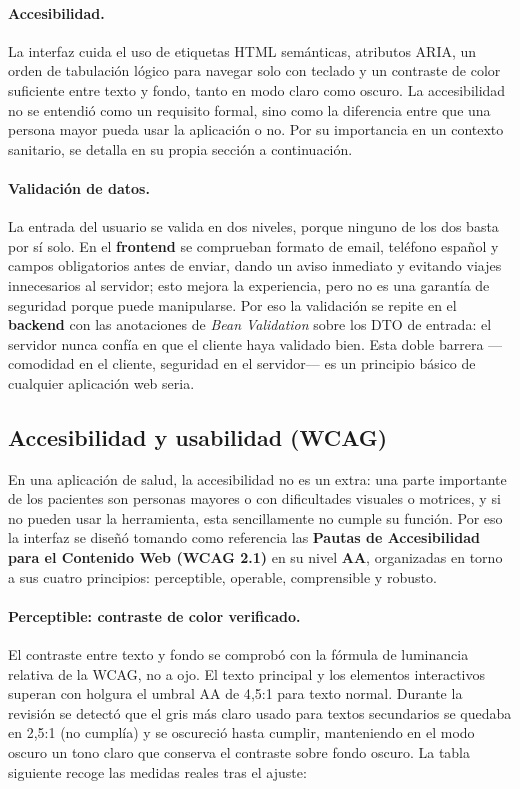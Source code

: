 \documentclass[12pt,a4paper]{report}
\begin{document}
\paragraph{Accesibilidad.} La interfaz cuida el uso de etiquetas HTML semánticas, atributos ARIA, un orden de tabulación lógico para navegar solo con teclado y un contraste de color suficiente entre texto y fondo, tanto en modo claro como oscuro. La accesibilidad no se entendió como un requisito formal, sino como la diferencia entre que una persona mayor pueda usar la aplicación o no. Por su importancia en un contexto sanitario, se detalla en su propia sección a continuación.

\paragraph{Validación de datos.} La entrada del usuario se valida en dos niveles, porque ninguno de los dos basta por sí solo. En el \textbf{frontend} se comprueban formato de email, teléfono español y campos obligatorios antes de enviar, dando un aviso inmediato y evitando viajes innecesarios al servidor; esto mejora la experiencia, pero no es una garantía de seguridad porque puede manipularse. Por eso la validación se repite en el \textbf{backend} con las anotaciones de \emph{Bean Validation} sobre los DTO de entrada: el servidor nunca confía en que el cliente haya validado bien. Esta doble barrera —comodidad en el cliente, seguridad en el servidor— es un principio básico de cualquier aplicación web seria.

\subsection{Accesibilidad y usabilidad (WCAG)}

En una aplicación de salud, la accesibilidad no es un extra: una parte importante de los pacientes son personas mayores o con dificultades visuales o motrices, y si no pueden usar la herramienta, esta sencillamente no cumple su función. Por eso la interfaz se diseñó tomando como referencia las \textbf{Pautas de Accesibilidad para el Contenido Web (WCAG 2.1)} en su nivel \textbf{AA}, organizadas en torno a sus cuatro principios: perceptible, operable, comprensible y robusto.

\paragraph{Perceptible: contraste de color verificado.} El contraste entre texto y fondo se comprobó con la fórmula de luminancia relativa de la WCAG, no a ojo. El texto principal y los elementos interactivos superan con holgura el umbral AA de 4{,}5:1 para texto normal. Durante la revisión se detectó que el gris más claro usado para textos secundarios se quedaba en 2{,}5:1 (no cumplía) y se oscureció hasta cumplir, manteniendo en el modo oscuro un tono claro que conserva el contraste sobre fondo oscuro. La tabla siguiente recoge las medidas reales tras el ajuste:
\end{document}
